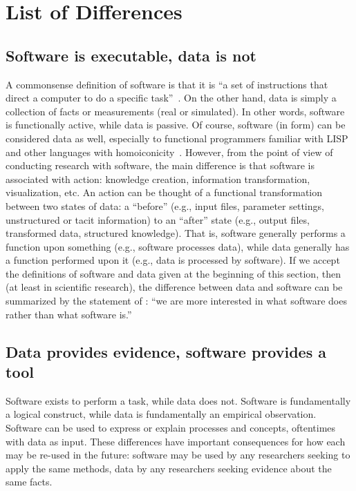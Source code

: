 \documentclass[fleqn,10pt]{wlpeerj} %
\begin{document}
\section*{List of Differences}
\label{sec:differences}

\subsection*{Software is executable, data is not}

A commonsense definition of software is that it is ``a set of instructions that direct a computer to do a specific task''~\citep{Chun2004}. On the other hand, data is simply a collection of facts or measurements (real or simulated). In other words, software is functionally active, while data is passive. Of course, software (in form) can be considered data as well, especially to functional programmers familiar with LISP and other languages with homoiconicity~\citep{wiki-homoiconicity}. However, from the point of view of conducting research with software, the main difference is that software is associated with action: knowledge creation, information transformation, visualization, etc. An action can be thought of a functional transformation between two states of data: a ``before'' (e.g., input files, parameter settings, unstructured or tacit information) to an ``after'' state (e.g., output files, transformed data, structured knowledge). That is, software generally performs a function upon something (e.g., software processes data), while data generally has a function performed upon it (e.g., data is processed by software). If we accept the definitions of software and data given at the beginning of this section, then (at least in scientific research), the difference between data and software can be summarized by the statement of \cite{Matthews2010}: ``we are more interested in what software does rather than what software is.''

\subsection*{Data provides evidence, software provides a tool}

Software exists to perform a task, while data does not. Software is fundamentally a logical construct, while data is fundamentally an empirical observation. Software can be used to express or explain processes and concepts, oftentimes with data as input. These differences have important consequences for how each may be re-used in the future: software may be used by any researchers seeking to apply the same methods, data by any researchers seeking evidence about the same facts.
\end{document}
